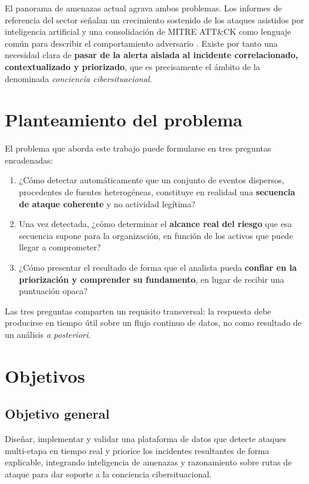 El panorama de amenazas actual agrava ambos problemas. Los informes de referencia del sector
señalan un crecimiento sostenido de los ataques asistidos por inteligencia artificial y una
consolidación de MITRE ATT\&CK \cite{mitre_attack} como lenguaje común para describir el
comportamiento adversario \cite{enisa2025}. Existe por tanto una necesidad clara de
\textbf{pasar de la alerta aislada al incidente correlacionado, contextualizado y
priorizado}, que es precisamente el ámbito de la denominada \textit{conciencia
cibersituacional}.

\section{Planteamiento del problema}

El problema que aborda este trabajo puede formularse en tres preguntas encadenadas:

\begin{enumerate}
    \item ¿Cómo detectar automáticamente que un conjunto de eventos dispersos, procedentes
    de fuentes heterogéneas, constituye en realidad una \textbf{secuencia de ataque
    coherente} y no actividad legítima?
    \item Una vez detectada, ¿cómo determinar el \textbf{alcance real del riesgo} que esa
    secuencia supone para la organización, en función de los activos que puede llegar a
    comprometer?
    \item ¿Cómo presentar el resultado de forma que el analista pueda \textbf{confiar en la
    priorización y comprender su fundamento}, en lugar de recibir una puntuación opaca?
\end{enumerate}

Las tres preguntas comparten un requisito transversal: la respuesta debe producirse en
tiempo útil sobre un flujo continuo de datos, no como resultado de un análisis
\textit{a posteriori}.

\section{Objetivos}

\subsection{Objetivo general}

Diseñar, implementar y validar una plataforma de datos que detecte ataques multi-etapa en
tiempo real y priorice los incidentes resultantes de forma explicable, integrando
inteligencia de amenazas y razonamiento sobre rutas de ataque para dar soporte a la
conciencia cibersituacional.

